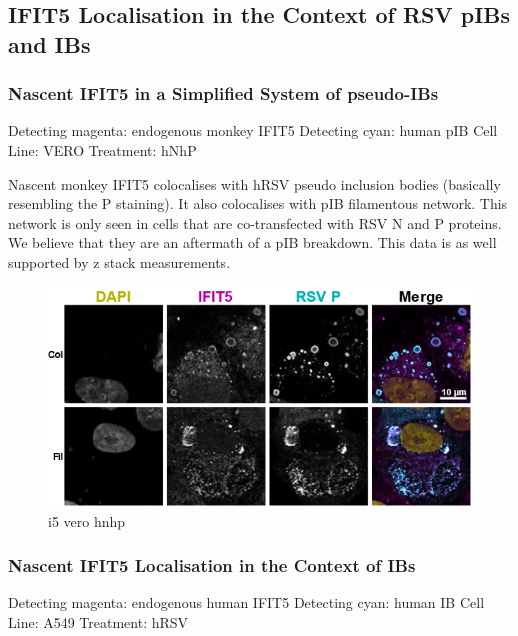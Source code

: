 \subsection{IFIT5 Localisation in the Context of RSV pIBs and IBs} \label{subsec:IFIT5 Localisation in the Context of RSV pIBs and IBs}
\subsubsection{Nascent IFIT5 in a Simplified System of pseudo-IBs} \label{Nascent IFIT5 in a Simplified System of pseudo-IBs}
Detecting magenta: endogenous monkey IFIT5 \newline
Detecting cyan: human pIB \newline
Cell Line: VERO \newline
Treatment: hNhP \newline

Nascent monkey IFIT5 colocalises with hRSV pseudo inclusion bodies (basically resembling the P staining). It also colocalises with pIB filamentous network. This network is only seen in cells that are co-transfected with RSV N and P proteins. We believe that they are an aftermath of a pIB breakdown. This data is as well supported by z stack measurements.

\begin{figure}
    \centering
    \includegraphics[width=1\linewidth]{09. Chapter 4/Figs/05. IFIT5/01. vero hnhp.png}
    \caption[i5 vero hnhp]{i5 vero hnhp}
    \label{fig:i5 vero hnhp}
\end{figure}

\subsubsection{Nascent IFIT5 Localisation in the Context of IBs} \label{Nascent IFIT5 Localisation in the Context of IBs}
Detecting magenta: endogenous human IFIT5 \newline
Detecting cyan: human IB \newline
Cell Line: A549 \newline
Treatment: hRSV \newline

